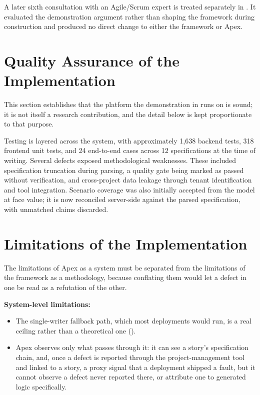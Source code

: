 A later sixth consultation with an Agile/Scrum expert is treated separately in . It evaluated the demonstration argument rather than shaping the framework during construction and produced no direct change to either the framework or Apex.

\section{Quality Assurance of the Implementation}
\label{sec:apex_qa}

This section establishes that the platform the demonstration in  runs on is sound; it is not itself a research contribution, and the detail below is kept proportionate to that purpose.

Testing is layered across the system, with approximately 1,638 backend tests, 318 frontend unit tests, and 24 end-to-end cases across 12 specifications at the time of writing. Several defects exposed methodological weaknesses. These included specification truncation during parsing, a quality gate being marked as passed without verification, and cross-project data leakage through tenant identification and tool integration. Scenario coverage was also initially accepted from the model at face value; it is now reconciled server-side against the parsed specification, with unmatched claims discarded.

\section{Limitations of the Implementation}
\label{sec:apex_limitations}

The limitations of Apex as a system must be separated from the limitations of the framework as a methodology, because conflating them would let a defect in one be read as a refutation of the other.

\vspace{0.2cm}

\noindent\textbf{System-level limitations:}

\begin{itemize}[leftmargin=0.6cm, itemsep=0.4em]

\item The single-writer fallback path, which most deployments would run, is a real ceiling rather than a theoretical one ().

\item Apex observes only what passes through it: it can see a story's specification chain, and, once a defect is reported through the project-management tool and linked to a story, a proxy signal that a deployment shipped a fault, but it cannot observe a defect never reported there, or attribute one to generated logic specifically.

\end{itemize}

